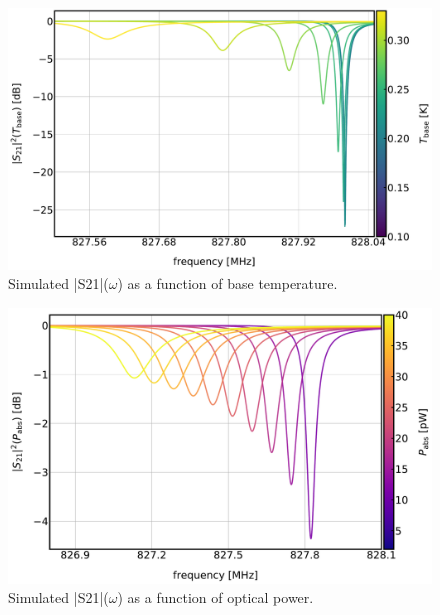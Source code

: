 \begin{figure}[!htbp]
  \centering
  \includegraphics[width=\textwidth]{figures/kid_model/S21_T250}
  \caption[~Simulated  as a function of base temperature.]{Simulated |\gls{S21}|($\omega$) as a function of base temperature.}
  \label{fig:S21_T}
\end{figure}

\begin{figure}[!htbp]
  \centering
  \includegraphics[width=\textwidth]{figures/kid_model/S21_opt250}
  \caption[~Simulated  as a function of optical power.]{Simulated |\gls{S21}|($\omega$) as a function of optical power.}
  \label{fig:S21_opt}
\end{figure}

